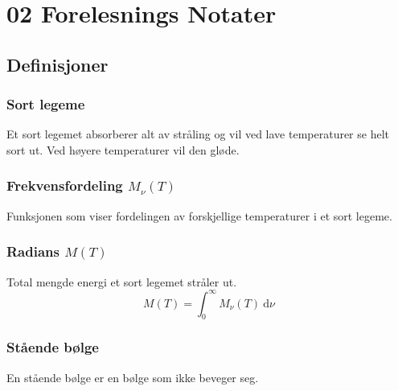 \chapter{02 Forelesnings Notater}
\section{Definisjoner}
\subsection{Sort legeme}    
Et sort legemet absorberer alt av stråling og vil ved lave temperaturer se helt sort ut. Ved høyere temperaturer vil den gløde. 

\subsection{Frekvensfordeling $M_{ν}(T)$}
Funksjonen som viser fordelingen av forskjellige temperaturer i et sort legeme. 

\subsection{Radians $M(T)$}
Total mengde energi et sort legemet stråler ut. 
\begin{equation}
M(T) = \int_{0}^{∞} M_{ν}(T) \ \mathrm{d}ν
\end{equation}

\subsection{Stående bølge}
En stående bølge er en bølge som ikke beveger seg. 
